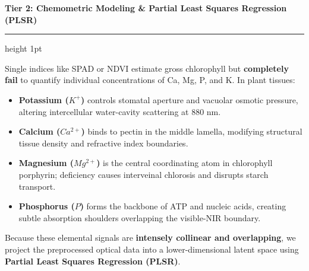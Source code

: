 \documentclass[11pt,a4paper,landscape]{article}
\begin{document}
\newpage
\begin{center}
    {\Large \textbf{\color{primary} Tier 2: Chemometric Modeling \& Partial Least Squares Regression (PLSR)}}
\end{center}
\vspace{0.2cm}
\hrule height 1pt \color{primary}
\vspace{0.4cm}

\begin{tcolorbox}[colback=primary!5!white,colframe=primary,title=\textbf{Why Simple Linear Formulas Fail \& Why PLSR is Mandatory},arc=2mm]
Single indices like SPAD or NDVI estimate gross chlorophyll but \textbf{completely fail} to quantify individual concentrations of Ca, Mg, P, and K. In plant tissues:
\begin{itemize}[leftmargin=*]
    \item \textbf{Potassium ($K^+$)} controls stomatal aperture and vacuolar osmotic pressure, altering intercellular water-cavity scattering at $880\text{ nm}$.
    \item \textbf{Calcium ($Ca^{2+}$)} binds to pectin in the middle lamella, modifying structural tissue density and refractive index boundaries.
    \item \textbf{Magnesium ($Mg^{2+}$)} is the central coordinating atom in chlorophyll porphyrin; deficiency causes interveinal chlorosis and disrupts starch transport.
    \item \textbf{Phosphorus ($P$)} forms the backbone of ATP and nucleic acids, creating subtle absorption shoulders overlapping the visible-NIR boundary.
\end{itemize}
Because these elemental signals are \textbf{intensely collinear and overlapping}, we project the preprocessed optical data into a lower-dimensional latent space using \textbf{Partial Least Squares Regression (PLSR)}.
\end{tcolorbox}
\end{document}
